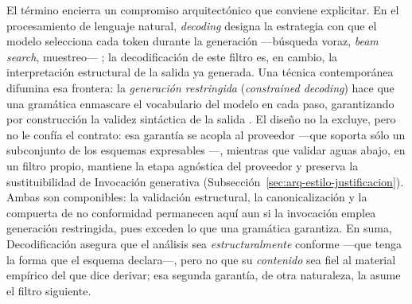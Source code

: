 \documentclass[12pt]{report}
\begin{document}
El término encierra un compromiso arquitectónico que conviene explicitar. En el procesamiento de lenguaje natural, \textit{decoding} designa la estrategia con que el modelo selecciona cada token durante la generación ---búsqueda voraz, \textit{beam search}, muestreo--- \citep{wiher:2022}; la decodificación de este filtro es, en cambio, la interpretación estructural de la salida ya generada. Una técnica contemporánea difumina esa frontera: la \textit{generación restringida} (\textit{constrained decoding}) hace que una gramática enmascare el vocabulario del modelo en cada paso, garantizando por construcción la validez sintáctica de la salida \citep{willardlouf:2023, geng:2025}. El diseño no la excluye, pero no le confía el contrato: esa garantía se acopla al proveedor ---que soporta sólo un subconjunto de los esquemas expresables \citep{geng:2025}---, mientras que validar aguas abajo, en un filtro propio, mantiene la etapa agnóstica del proveedor y preserva la sustituibilidad de Invocación generativa (Subsección~\ref{sec:arq-estilo-justificacion}). Ambas son componibles: la validación estructural, la canonicalización y la compuerta de no conformidad permanecen aquí aun si la invocación emplea generación restringida, pues exceden lo que una gramática garantiza. En suma, Decodificación asegura que el análisis sea \textit{estructuralmente} conforme ---que tenga la forma que el esquema declara---, pero no que su \textit{contenido} sea fiel al material empírico del que dice derivar; esa segunda garantía, de otra naturaleza, la asume el filtro siguiente.
\end{document}
